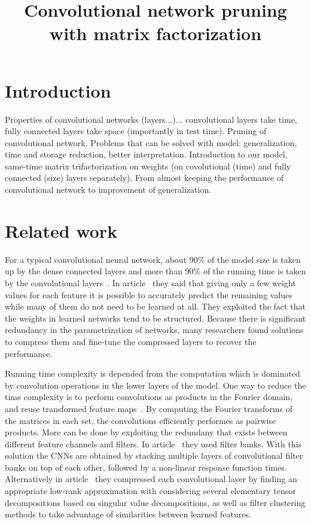\documentclass{article} %
\title{Convolutional network pruning with matrix factorization}
\begin{document}
\maketitle

\begin{abstract}

\end{abstract}

\section{Introduction}
Properties of convolutional networks (layers...)... convolutional layers take time, fully connected layers take space (importantly in test time). Pruning of convolutional network. Problems that can be solved with model: generalization, time and storage reduction, better interpretation. Introduction to our model, same-time matrix trifactorization on weights (on covolutional (time) and fully connected (size) layers separately). From almost keeping the performance of convolutional network to improvement of generalization.

\section{Related work}

For a typical convolutional neural network, about 90\% of the model size is taken up by the dense connected layers and more than 90\% of the running time is taken by the convolutional layers~\cite{zeiler2014visualizing}. In article~\cite{denil2013predicting} they said that giving only a few weight values for each feature it is possible to accurately predict the remaining values while many of them do not need to be learned at all. They exploited the fact that the weights in learned networks tend to be structured. Because there is significant redundancy in the parametrization of networks, many researchers found solutions to compress them and fine-tune the compressed layers to recover the performance. 

Running time complexity is depended from the computation which is dominated by convolution operations in the lower layers of the model. One way to reduce the time complexity is to perform convolutions as products in the Fourier domain, and reuse transformed feature maps~\cite{mathieu2013fast}. By computing the Fourier transforms of the matrices in each set, the convolutions efficiently performes as pairwise products. More can be done by exploiting the redundany that exists between different feature channels and filters. In article~\cite{jaderberg2014speeding} they used filter banks. With this solution the CNNs are obtained by stacking multiple layers of convolutional filter banks on top of each other, followed by a non-linear response function times. Alternatively in article~\cite{denton2014exploiting} they compressed each convolutional layer by finding an appropriate low-rank approximation with considering several elementary tensor decompositions based on singular value decompositions, as well as filter clustering methods to take advantage of similarities between learned features.
\end{document}

